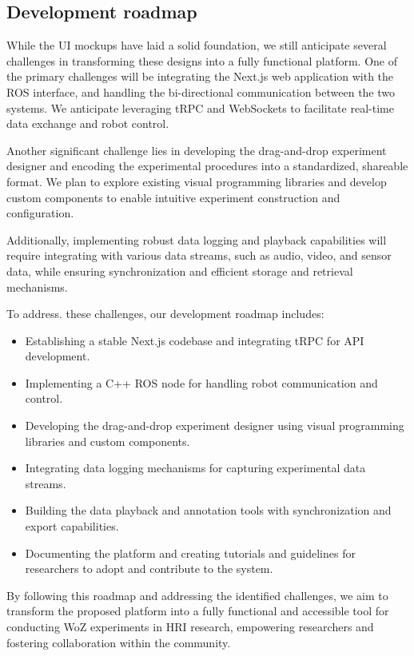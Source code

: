 \documentclass[letterpaper, 10 pt, conference]{ieeeconf}
\begin{document}
\subsection{Development roadmap}

While the UI mockups have laid a solid foundation, we still anticipate several challenges in transforming these designs into a fully functional platform. One of the primary challenges will be integrating the Next.js web application with the ROS interface, and handling the bi-directional communication between the two systems. We anticipate leveraging tRPC and WebSockets to facilitate real-time data exchange and robot control.

Another significant challenge lies in developing the drag-and-drop experiment designer and encoding the experimental procedures into a standardized, shareable format. We plan to explore existing visual programming libraries and develop custom components to enable intuitive experiment construction and configuration.

Additionally, implementing robust data logging and playback capabilities will require integrating with various data streams, such as audio, video, and sensor data, while ensuring synchronization and efficient storage and retrieval mechanisms.


To address. these challenges, our development roadmap includes:
\begin{itemize}
    \item Establishing a stable Next.js codebase and integrating tRPC for API development.
    \item Implementing a C++ ROS node for handling robot communication and control.
    \item Developing the drag-and-drop experiment designer using visual programming libraries and custom components.
    \item Integrating data logging mechanisms for capturing experimental data streams.
    \item Building the data playback and annotation tools with synchronization and export capabilities.
    \item Documenting the platform and creating tutorials and guidelines for researchers to adopt and contribute to the system.
\end{itemize}

By following this roadmap and addressing the identified challenges, we aim to transform the proposed platform into a fully functional and accessible tool for conducting WoZ experiments in HRI research, empowering researchers and fostering collaboration within the community.
\end{document}
